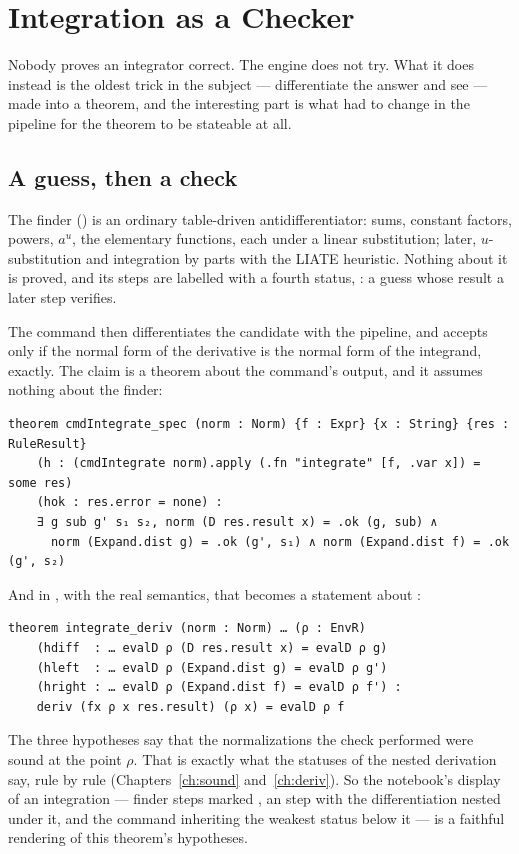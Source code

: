 \chapter{Integration as a Checker}\label{ch:integrate}

Nobody proves an integrator correct. The engine does not try. What it does instead is the oldest
trick in the subject --- differentiate the answer and see --- made into a theorem, and the
interesting part is what had to change in the pipeline for the theorem to be stateable at all.

\section{A guess, then a check}

The finder () is an ordinary table-driven antidifferentiator: sums,
constant factors, powers, $a^u$, the elementary functions, each under a linear substitution;
later, $u$-substitution and integration by parts with the LIATE heuristic. Nothing about it is
proved, and its steps are labelled with a fourth status, : a guess whose result a
later step verifies.

The command then differentiates the candidate with the pipeline, and accepts only if the normal
form of the derivative is the normal form of the integrand, exactly. The claim is a theorem about
the command's output, and it assumes nothing about the finder:

\begin{verbatim}
theorem cmdIntegrate_spec (norm : Norm) {f : Expr} {x : String} {res : RuleResult}
    (h : (cmdIntegrate norm).apply (.fn "integrate" [f, .var x]) = some res)
    (hok : res.error = none) :
    ∃ g sub g' s₁ s₂, norm (D res.result x) = .ok (g, sub) ∧
      norm (Expand.dist g) = .ok (g', s₁) ∧ norm (Expand.dist f) = .ok (g', s₂)
\end{verbatim}

And in , with the real semantics, that becomes a statement about :

\begin{verbatim}
theorem integrate_deriv (norm : Norm) … (ρ : EnvR)
    (hdiff  : … evalD ρ (D res.result x) = evalD ρ g)
    (hleft  : … evalD ρ (Expand.dist g) = evalD ρ g')
    (hright : … evalD ρ (Expand.dist f) = evalD ρ f') :
    deriv (fx ρ x res.result) (ρ x) = evalD ρ f
\end{verbatim}

The three hypotheses say that the normalizations the check performed were sound at the point
$\rho$. That is exactly what the statuses of the nested derivation say, rule by rule
(Chapters~\ref{ch:sound} and~\ref{ch:deriv}). So the notebook's display of an integration ---
finder steps marked , an  step with the differentiation nested
under it, and the command inheriting the weakest status below it --- is a faithful rendering of
this theorem's hypotheses.

